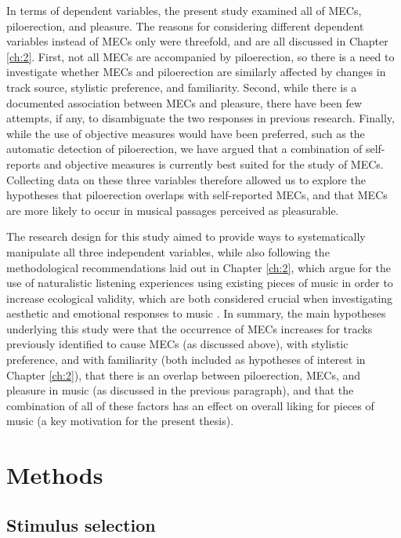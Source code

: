 In terms of dependent variables, the present study examined all of MECs, piloerection, and pleasure. The reasons for considering different dependent variables instead of MECs only were threefold, and are all discussed in Chapter \ref{ch:2}. First, not all MECs are accompanied by piloerection, so there is a need to investigate whether MECs and piloerection are similarly affected by changes in track source, stylistic preference, and familiarity. Second, while there is a documented association between MECs and pleasure, there have been few attempts, if any, to disambiguate the two responses in previous research. Finally, while the use of objective measures would have been preferred, such as the automatic detection of piloerection, we have argued that a combination of self-reports and objective measures is currently best suited for the study of MECs. Collecting data on these three variables therefore allowed us to explore the hypotheses that piloerection overlaps with self-reported MECs, and that MECs are more likely to occur in musical passages perceived as pleasurable.

The research design for this study aimed to provide ways to systematically manipulate all three independent variables, while also following the methodological recommendations laid out in Chapter \ref{ch:2}, which argue for the use of naturalistic listening experiences using existing pieces of music in order to increase ecological validity, which are both considered crucial when investigating aesthetic and emotional responses to music \parencite{eerola2018,hargreaves2010, hodges2016}. In summary, the main hypotheses underlying this study were that the occurrence of MECs increases for tracks previously identified to cause MECs (as discussed above), with stylistic preference, and with familiarity (both included as hypotheses of interest in Chapter \ref{ch:2}), that there is an overlap between piloerection, MECs, and pleasure in music (as discussed in the previous paragraph), and that the combination of all of these factors has an effect on overall liking for pieces of music (a key motivation for the present thesis).

\section{Methods}

\subsection{Stimulus selection}

